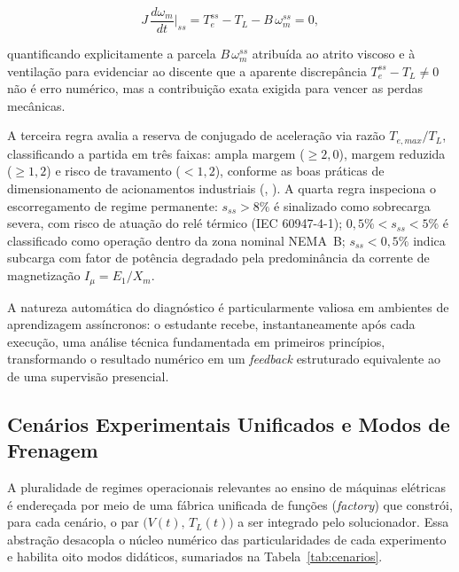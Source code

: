 \documentclass[a4paper]{ifacconf}
\begin{document}
\begin{equation}
\label{eq:balanco_torques}
J\,\frac{d\omega_m}{dt}\bigg|_{ss} = T_e^{ss} - T_L - B\,\omega_m^{ss} = 0,
\end{equation}

\noindent quantificando explicitamente a parcela $B\,\omega_m^{ss}$ atribuída ao atrito viscoso e à ventilação para evidenciar ao discente que a aparente discrepância $T_e^{ss} - T_L \neq 0$ não é erro numérico, mas a contribuição exata exigida para vencer as perdas mecânicas.

A terceira regra avalia a reserva de conjugado de aceleração via razão $T_{e,max}/T_L$, classificando a partida em três faixas: ampla margem ($\geq 2{,}0$), margem reduzida ($\geq 1{,}2$) e risco de travamento ($<1{,}2$), conforme as boas práticas de dimensionamento de acionamentos industriais (\citeauthor{singh2015}, \citeyear{singh2015}). A quarta regra inspeciona o escorregamento de regime permanente: $s_{ss} > 8\%$ é sinalizado como sobrecarga severa, com risco de atuação do relé térmico (IEC 60947-4-1); $0{,}5\% < s_{ss} < 5\%$ é classificado como operação dentro da zona nominal NEMA~B; $s_{ss} < 0{,}5\%$ indica subcarga com fator de potência degradado pela predominância da corrente de magnetização $I_\mu = E_1/X_m$.

A natureza automática do diagnóstico é particularmente valiosa em ambientes de aprendizagem assíncronos: o estudante recebe, instantaneamente após cada execução, uma análise técnica fundamentada em primeiros princípios, transformando o resultado numérico em um \textit{feedback} estruturado equivalente ao de uma supervisão presencial.

\subsection{Cenários Experimentais Unificados e Modos de Frenagem}
\label{subsec:cenarios}

A pluralidade de regimes operacionais relevantes ao ensino de máquinas elétricas é endereçada por meio de uma fábrica unificada de funções (\textit{factory}) que constrói, para cada cenário, o par $\bigl(V(t),\,T_L(t)\bigr)$ a ser integrado pelo solucionador. Essa abstração desacopla o núcleo numérico das particularidades de cada experimento e habilita oito modos didáticos, sumariados na Tabela~\ref{tab:cenarios}.
\end{document}
